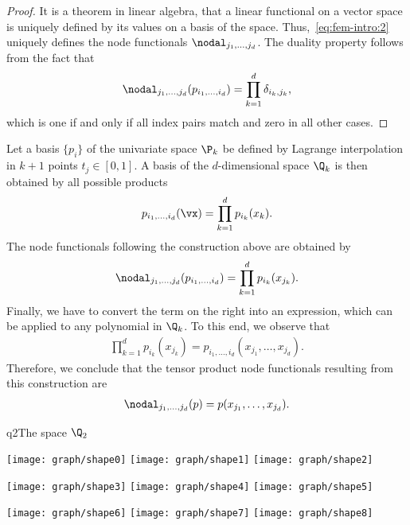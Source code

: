 \begin{proof}
  It is a theorem in linear algebra, that a linear functional on a
  vector space is uniquely defined by its values on a basis of the
  space. Thus,~\eqref{eq:fem-intro:2} uniquely defines the node
  functionals $\nodal_{j_1,\dots,j_d}$. The duality property follows
  from the fact that
  \begin{gather*}
    \nodal_{j_1,\dots,j_d}(p_{i_1,\dots,i_d}) = \prod_{k=1}^d \delta_{i_k,j_k},
  \end{gather*}
  which is one if and only if all index pairs match and zero in all
  other cases.
\end{proof}

\begin{example}
  Let a basis $\{p_i\}$ of the univariate space $\P_k$ be defined by
  Lagrange interpolation in $k+1$ points $t_j \in [0,1]$. A basis of
  the $d$-dimensional space $\Q_k$ is then obtained by all possible
  products
  \begin{gather*}
    p_{i_1,\dots,i_d}(\vx) = \prod_{k=1}^d p_{i_k}(x_k).
  \end{gather*}
  The node functionals following the construction above are obtained by
  \begin{gather*}
    \nodal_{j_1,\dots,j_d}(p_{i_1,\dots,i_d}) = \prod_{k=1}^d p_{i_k}(x_{j_k}).
  \end{gather*}
  Finally, we have to convert the term on the right into an
  expression, which can be applied to any polynomial in $\Q_k$. To
  this end, we observe that
  \begin{gather*}
    \prod_{k=1}^d p_{i_k}(x_{j_k}) = p_{i_1,\dots,i_d}(x_{j_1},\dots,x_{j_d}).
  \end{gather*}
  Therefore, we conclude that the tensor product node functionals
  resulting from this construction are
  \begin{gather*}
    \nodal_{j_1,\dots,j_d}(p) = p(x_{j_1},\dots,x_{j_d}).
  \end{gather*}
\end{example}

\begin{Example*}{q2}{The space $\Q_2$}
    \begin{center}
    \texttt{[image: graph/shape0]}
    \texttt{[image: graph/shape1]}
    \texttt{[image: graph/shape2]}

    \texttt{[image: graph/shape3]}
    \texttt{[image: graph/shape4]}
    \texttt{[image: graph/shape5]}

    \texttt{[image: graph/shape6]}
    \texttt{[image: graph/shape7]}
    \texttt{[image: graph/shape8]}
  \end{center}
\end{Example*}


